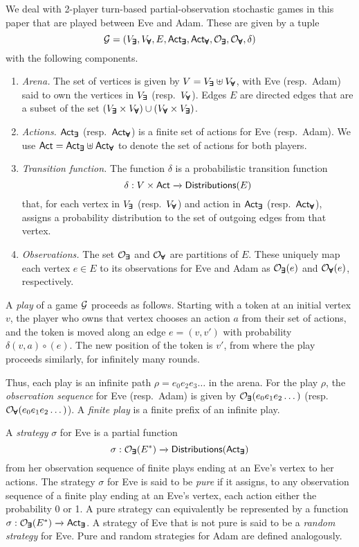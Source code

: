 We deal with 2-player turn-based partial-observation stochastic games in this paper that are played between Eve and Adam. These are given by a tuple $$\mathcal{G}=(V_{\pmb{\exists}},V_{\pmb{\forall}},E,{\mathsf{Act}}_{\pmb{\exists}},{\mathsf{Act}}_{\pmb{\forall}},\mathcal{O}_{\pmb{\exists}},\mathcal{O}_{\pmb{\forall}},\delta)$$ with the following components.
\begin{enumerate}
    \item \emph{Arena.} The set of vertices is given by $V=V_{\pmb{\exists}}\uplus V_{\pmb{\forall}}$, with Eve (resp.\ Adam) said to own the vertices in $V_{\pmb{\exists}}$ (resp.\ $V_{\pmb{\forall}}$). Edges $E$ are directed edges that are a subset of the set $(V_{\pmb{\exists}} \times V_{\pmb{\forall}}) \cup (V_{\pmb{\forall}}\times V_{\pmb{\exists}})$.
    \item \emph{Actions.} ${\mathsf{Act}}_{\pmb{\exists}}$ (resp.\ ${\mathsf{Act}}_{\pmb{\forall}}$) is a finite set of actions for Eve (resp.\ Adam). We use ${\mathsf{Act}}={\mathsf{Act}}_{\pmb{\exists}} \uplus {\mathsf{Act}}_{\pmb{\forall}}$ to denote the set of actions for both players.  
    \item \emph{Transition function.} The function $\delta$ is a probabilistic transition function $$\delta:V\times {\mathsf{Act}} \xrightarrow{} {\mathsf{Distributions}}(E)$$ that, for each vertex in $V_{\pmb{\exists}}$ (resp.\ $V_{\pmb{\forall}}$) and action in ${\mathsf{Act}}_{\pmb{\exists}}$ (resp.\ ${\mathsf{Act}}_{\pmb{\forall}}$), assigns a probability distribution to the set of outgoing edges from that vertex. 
    \item \emph{Observations.} The set $\mathcal{O}_{\pmb{\exists}}$ and $\mathcal{O}_{\pmb{\forall}}$ are partitions of $E$. These uniquely map each vertex $e\in E$ to its observations for Eve and Adam as $\mathcal{O}_{\pmb{\exists}}(e)$ and $\mathcal{O}_{\pmb{\forall}}(e)$, respectively.
\end{enumerate}

A \emph{play} of a game $\mathcal{G}$ proceeds as follows. Starting with a token at an initial vertex $v$, the player who owns that vertex chooses an action $a$ from their set of actions, and the token is moved along an edge $e=(v,v')$ with probability $\delta(v,a)\circ (e)$. The new position of the token is $v'$, from where the play proceeds similarly, for infinitely many rounds. 

Thus, each play is an infinite path $\rho=e_0 e_2 e_3 \dots$ in the arena. For the play $\rho$, the \emph{observation sequence} for Eve (resp.\ Adam) is given by $\mathcal{O}_{\pmb{\exists}}(e_0 e_1 e_2 \dots)$ (resp.\ $\mathcal{O}_{\pmb{\forall}}(e_0 e_1 e_2\dots)$). A \emph{finite play} is a finite prefix of an infinite play.

A \emph{strategy} $\sigma$ for Eve is a partial function $$\sigma:\mathcal{O}_{\pmb{\exists}} (E^*)\xrightarrow{}{\mathsf{Distributions}}({\mathsf{Act}}_{\pmb{\exists}})$$ from her observation sequence of finite plays ending at an Eve's vertex to her actions. The strategy $\sigma$ for Eve is said to be \emph{pure} if it assigns, to any observation sequence of a finite play ending at an Eve's vertex, each action either the probability 0 or 1. A pure strategy can equivalently be represented by a function $\sigma:\mathcal{O}_{\pmb{\exists}} (E^*)\xrightarrow{}{\mathsf{Act}}_{\pmb{\exists}}$. A strategy of Eve that is not pure is said to be a \emph{random strategy} for Eve. Pure and random strategies for Adam are defined analogously. 

